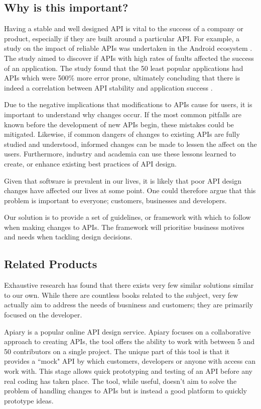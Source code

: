 \documentclass{article}
\begin{document}
\subsection{Why is this important?}
Having a stable and well designed API is vital to the success of a company or product, especially if they are built around a particular API. For example, a study on the impact of reliable APIs was undertaken in the Android ecosystem \cite{mcdonnell2013empirical}. The study aimed to discover if APIs with high rates of faults affected the success of an application. The study found that the 50 least popular applications had APIs which were 500\% more error prone, ultimately concluding that there is indeed a correlation between API stability and application success \cite{mcdonnell2013empirical}. 

Due to the negative implications that modifications to APIs cause for users, it is important to understand why changes occur. If the most common pitfalls are known before the development of new APIs begin, these mistakes could be mitigated. Likewise, if common dangers of changes to existing APIs are fully studied and understood, informed changes can be made to lessen the affect on the users. Furthermore, industry and academia can use these lessons learned to create, or enhance existing best practices of API design.

Given that software is prevalent in our lives, it is likely that poor API design changes have affected our lives at some point. One could therefore argue that this problem is important to everyone; customers, businesses and developers.

Our solution is to provide a set of guidelines, or framework with which to follow when making changes to APIs. The framework will prioritise business motives and needs when tackling design decisions.

\subsection{Related Products}
Exhaustive research has found that there exists very few similar solutions similar to our own. While there are countless books related to the subject, very few actually aim to address the needs of busniness and customers; they are primarily focused on the developer.

Apiary is a popular online API design service. Apiary focuses on a collaborative approach to creating APIs, the tool offers the ability to work with between 5 and 50 contributors on a single project. The unique part of this tool is that it provides a ``mock" API by which customers, developers or anyone with access can work with. This stage allows quick prototyping and testing of an API before any real coding has taken place. The tool, while useful, doesn't aim to solve the problem of handling changes to APIs but is instead a good platform to quickly prototype ideas.
\end{document}
